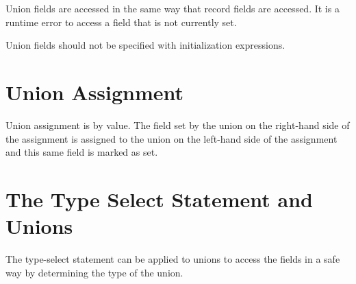 Union fields are accessed in the same way that record fields are
accessed.  It is a runtime error to access a field that is not
currently set.

Union fields should not be specified with initialization expressions.

\section{Union Assignment}
\label{Union_Assignment}

Union assignment is by value.  The field set by the union on the
right-hand side of the assignment is assigned to the union on the
left-hand side of the assignment and this same field is marked as set.

\section{The Type Select Statement and Unions}
\label{The_Type_Select_Statement_and_Unions}

The type-select statement can be applied to unions to access the
fields in a safe way by determining the type of the union.
